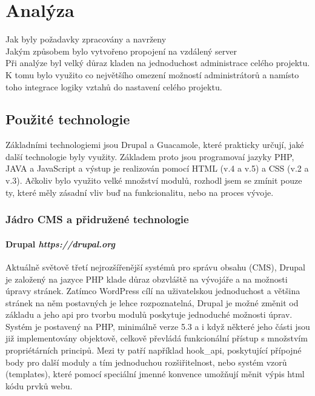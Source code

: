 
\chapter{Analýza}
\label{chap:analyza}

Jak byly požadavky zpracovány a navrženy \\
Jakým způsobem bylo vytvořeno propojení na vzdálený server \\
Při analýze byl velký důraz kladen na jednoduchost administrace celého projektu. K tomu bylo využito co největšího omezení možností administrátorů a namísto toho integrace logiky vztahů do nastavení celého projektu.

\section{Použité technologie}
\label{chap:technologies}

Základními technologiemi jsou Drupal a Guacamole, které prakticky určují, jaké další technologie byly využity. Základem proto jsou programovaí jazyky PHP, JAVA a JavaScript a výstup je realizován pomocí HTML (v.4 a v.5) a CSS (v.2 a v.3). Ačkoliv bylo využito velké množství modulů, rozhodl jsem se zmínit pouze ty, které měly zásadní vliv buď na funkcionalitu, nebo na proces vývoje.

\subsection{Jádro CMS a přidružené technologie}

\subsubsection*{Drupal \hfill \emph{https://drupal.org}} 

Aktuálně světově třetí nejrozšířenější\cite{website:cms-market-share} systémů pro správu obsahu (CMS), Drupal je založený na jazyce PHP klade důraz obzvláště na vývojáře a na možnosti úpravy stránek. Zatímco WordPress cílí na uživatelskou jednoduchost a většina stránek na něm postavných je lehce rozpoznatelná, Drupal je možné změnit od základu a jeho \gls{api} pro tvorbu modulů poskytuje jednoduché možnosti úprav. Systém je postavený na PHP, minimálně verze 5.3 a i když některé jeho části jsou již implementovány objektově, celkově převládá funkcionální přístup s množstvím propriétárních principů. Mezi ty patří například hook\_api, poskytující přípojné body pro další moduly a tím jednoduchou rozšiřitelnost, nebo systém vzorů (templates), které pomocí speciální jmenné konvence umožňují měnit výpis html kódu prvků webu.

